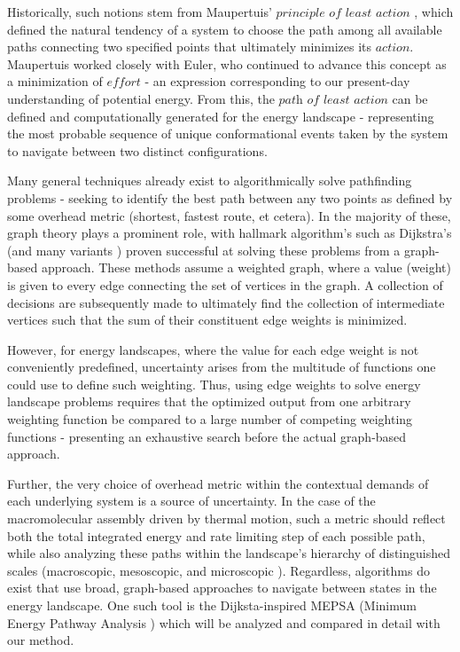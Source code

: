 \documentclass[twocolumn]{biophys-new}
\begin{document}
Historically, such notions stem from Maupertuis' $\textit{principle}$ $\textit{of}$ $\textit{least}$ $\textit{action}$ \cite{maupertuis}, which defined the natural tendency of a system to choose the path among all available paths connecting two specified points that ultimately minimizes its $action$. Maupertuis worked closely with Euler, who continued to advance this concept as a minimization of $\textit{effort}$ \cite{euler} - an expression corresponding to our present-day understanding of potential energy. From this, the $\textit{path}$ $\textit{of}$ $\textit{least}$ $\textit{action}$ can be defined and computationally generated for the energy landscape - representing the most probable sequence of unique conformational events taken by the system to navigate between two distinct configurations.

Many general techniques already exist to algorithmically solve pathfinding problems - seeking to identify the best path between any two points as defined by some overhead metric (shortest, fastest route, et cetera). In the majority of these, graph theory plays a prominent role, with hallmark algorithm's such as Dijkstra's \cite{dijkstra} (and many variants \cite{gtheory1,gtheory2,gtheory3}) proven successful at solving these problems from a graph-based approach. These methods assume a weighted graph, where a value (weight) is given to every edge connecting the set of vertices in the graph. A collection of decisions are subsequently made to ultimately find the collection of intermediate vertices such that the sum of their constituent edge weights is minimized. 

However, for energy landscapes, where the value for each edge weight is not conveniently predefined, uncertainty arises from the multitude of functions one could use to define such weighting. Thus, using edge weights to solve energy landscape problems requires that the optimized output from one arbitrary weighting function be compared to a large number of competing weighting functions - presenting an exhaustive search before the actual graph-based approach. 

Further, the very choice of overhead metric within the contextual demands of each underlying system is a source of uncertainty. In the case of the macromolecular assembly driven by thermal motion, such a metric should reflect both the total integrated energy and rate limiting step of each possible path, while also analyzing these paths within the landscape's hierarchy of distinguished scales (macroscopic, mesoscopic, and microscopic \cite{munro}). Regardless, algorithms do exist that use broad, graph-based approaches to navigate between states in the energy landscape. One such tool is the Dijksta-inspired MEPSA (Minimum Energy Pathway Analysis \cite{mepsa}) which will be analyzed and compared in detail with our method.
\end{document}

